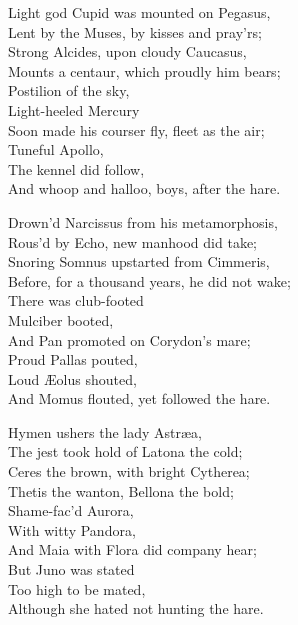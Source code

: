 \settowidth{\versewidth}{Light god Cupid was mounted on Pegas}
\begin{dcverse}\begin{patverse}
Light god Cupid was mounted on Pegasus,\\
Lent by the Muses, by kisses and pray’rs;\\
Strong Alcides, upon cloudy Caucasus,\\
Mounts a centaur, which proudly him bears;\\
Postilion of the sky,\\
Light-heeled Mercury\\
Soon made his courser fly, fleet as the air;\\
Tuneful Apollo,\\
The kennel did follow,\\
And whoop and halloo, boys, after the hare.
\end{patverse}

\begin{patverse}
Drown’d Narcissus from his metamorphosis,\\
Rous’d by Echo, new manhood did take;\\
Snoring Somnus upstarted from Cimmeris,\\
Before, for a thousand years, he did not wake;\\
There was club-footed \\
Mulciber booted,\\
And Pan promoted on Corydon’s mare;\\
Proud Pallas pouted,\\
Loud Æolus shouted,\\
And Momus flouted, yet followed the hare.
\end{patverse}

\begin{patverse}
Hymen ushers the lady Astræa,\\
The jest took hold of Latona the cold;\\
Ceres the brown, with bright Cytherea;\\
Thetis the wanton, Bellona the bold;\\
Shame-fac’d Aurora,\\
With witty Pandora,\\
And Maia with Flora did company hear;\\
But Juno was stated\\
Too high to be mated,\\
Although she hated not hunting the hare.
\end{patverse}


\end{dcverse}
